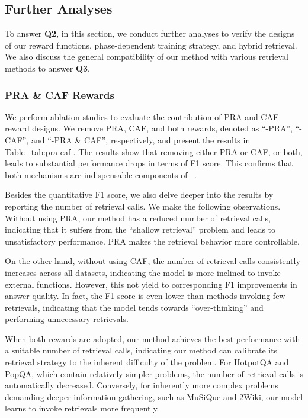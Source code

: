 

\subsection{Further Analyses}
To answer \textbf{Q2}, in this section, we conduct further analyses to verify the designs of our reward functions, phase-dependent training strategy, and hybrid retrieval. We also discuss the general compatibility of our method with various retrieval methods to answer \textbf{Q3}. 
\subsubsection{PRA \& CAF Rewards}
We perform ablation studies to evaluate the contribution of PRA and CAF reward designs. We remove PRA, CAF, and both rewards, denoted as ``-PRA'', ``-CAF'', and ``-PRA \& CAF'', respectively, and present the results in Table~\ref{tab:pra-caf}. The results show that removing either PRA or CAF, or both, leads to substantial performance drops in terms of F1 score. This confirms that both mechanisms are indispensable components of \methodname~. 



Besides the quantitative F1 score, we also delve deeper into the results by reporting the number of retrieval calls. We make the following observations. Without using PRA, our method has a reduced number of retrieval calls, indicating that it suffers from the ``shallow retrieval'' problem and leads to unsatisfactory performance. PRA makes the retrieval behavior more controllable. 



On the other hand, without using CAF, the number of retrieval calls consistently increases across all datasets, indicating the model is more inclined to invoke external functions. However, this not yield to corresponding F1 improvements in answer quality. In fact, the F1 score is even lower than methods invoking few retrievals, indicating that the model tends towards ``over-thinking'' and performing unnecessary retrievals.

When both rewards are adopted, our method achieves the best performance with a suitable number of retrieval calls, indicating our method can calibrate its retrieval strategy to the inherent difficulty of the problem. For HotpotQA and PopQA, which contain relatively simpler problems, the number of retrieval calls is automatically decreased. Conversely, for inherently more complex problems demanding deeper information gathering, such as MuSiQue and 2Wiki, our model learns to invoke retrievals more frequently. 








